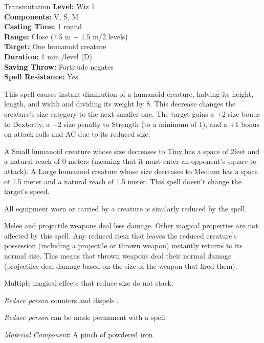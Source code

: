 {Transmutation}
{
	\textbf{Level:}
	Wiz 1\\
	\textbf{Components:}
	V, S, M\\
	\textbf{Casting Time:}
	1 round\\
	\textbf{Range:}
	Close (7.5 m + 1.5 m/2 levels)\\
	\textbf{Target:}
	One humanoid creature\\
	\textbf{Duration:}
	1 min./level (D)\\
	\textbf{Saving Throw:}
	Fortitude negates\\
	\textbf{Spell Resistance:}
	Yes\\
}
{
	This spell causes instant diminution of a humanoid creature, halving its height, length, and width and dividing its weight by 8. This decrease changes the creature's size category to the next smaller one. The target gains a +2 size bonus to Dexterity, a $-2$ size penalty to Strength (to a minimum of 1), and a +1 bonus on attack rolls and AC due to its reduced size.

	A Small humanoid creature whose size decreases to Tiny has a space of 2\onehalf feet and a natural reach of 0 meters (meaning that it must enter an opponent's square to attack). A Large humanoid creature whose size decreases to Medium has a space of 1.5 meter and a natural reach of 1.5 meter. This spell doesn't change the target's speed.

	All equipment worn or carried by a creature is similarly reduced by the spell.

	Melee and projectile weapons deal less damage. Other magical properties are not affected by this spell. Any reduced item that leaves the reduced creature's possession (including a projectile or thrown weapon) instantly returns to its normal size. This means that thrown weapons deal their normal damage (projectiles deal damage based on the size of the weapon that fired them).

	Multiple magical effects that reduce size do not stack.

	\emph{Reduce person} counters and dispels .

	\emph{Reduce person} can be made permanent with a  spell.

	\textit{Material Component}:
	A pinch of powdered iron.

}

